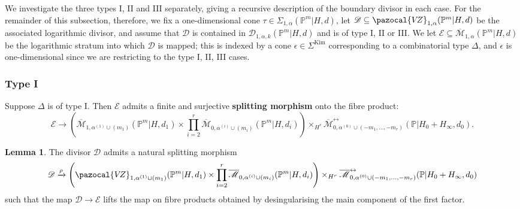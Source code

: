 \documentclass[11pt]{amsart}
\newcommand{\Kim}{\operatorname{Kim}}
\newcommand{\PP}{\mathbb P}
\newcommand{\VZ}{\pazocal{V\!Z}}
\renewcommand{\to}{\rightarrow}
\newcommand{\Mcal}{\mathcal{M}}
\newcommand{\Dcal}{\mathcal{D}}
\newcommand{\Ecal}{\mathcal{E}}
\newcommand{\ol}[1]{\overline{#1}}
\theoremstyle{definition}
\newtheorem{lemma}[thm]{Lemma}
\theoremstyle{definition}
\begin{document}
We investigate the three types I, II and III separately, giving a recursive description of the boundary divisor in each case. For the remainder of this subsection, therefore, we fix a one-dimensional cone $\tau \in \Sigma_{1,\alpha}(\PP^m|H,d)$, let $\Dcal \subseteq \VZ_{1,\alpha}(\PP^m|H,d)$ be the associated logarithmic divisor, and assume that $\Dcal$ is contained in $\Dcal_{1,\alpha,k}(\PP^m|H,d)$ and is of type I, II or III. We let $\Ecal \subseteq \ol\Mcal_{1,\alpha}(\PP^m|H,d)$ be the logarithmic stratum into which $\Dcal$ is mapped; this is indexed by a cone $\epsilon \in \Sigma^{\Kim}$ corresponding to a combinatorial type $\Delta$, and $\epsilon$ is one-dimensional since we are restricting to the type I, II, III cases.


\subsubsection{Type I}\label{subsubsection type A} Suppose $\Delta$ is of type I. Then $\Ecal$ admits a finite and surjective \textbf{splitting morphism} onto the fibre product:
\begin{equation*} \Ecal \to \left( \ol\Mcal_{1,\alpha^{(1)}\cup(m_1)}(\PP^m|H,d_1) \times \prod_{i=2}^r \ol\Mcal_{0,\alpha^{(i)}\cup(m_i)}(\PP^m|H,d_i) \right) \times_{H^r} \ol\Mcal^{\leftrightarrow}_{0,\alpha^{(0)}\cup (-m_1,\ldots,-m_r)}(\mathbb{P}|H_0+H_\infty,d_0).\end{equation*}

\begin{lemma} \label{Lemma type A gluing} The divisor $\Dcal$ admits a natural splitting morphism
\begin{equation*}\Dcal \xrightarrow{\rho} \left(\VZ_{1,\alpha^{(1)}\cup(m_1)}(\PP^m|H,d_1)\times\prod_{i=2}^r \ol\Mcal_{0,\alpha^{(i)}\cup(m_i)}(\PP^m|H,d_i)\right) \times_{H^r} \ol\Mcal^{\leftrightarrow}_{0,\alpha^{(0)}\cup (-m_1,\ldots,-m_r)}(\mathbb{P}|H_0+H_\infty,d_0)\end{equation*}
such that the map $\Dcal \to \Ecal$ lifts the map on fibre products obtained by desingularising the main component of the first factor.\end{lemma}
\end{document}
